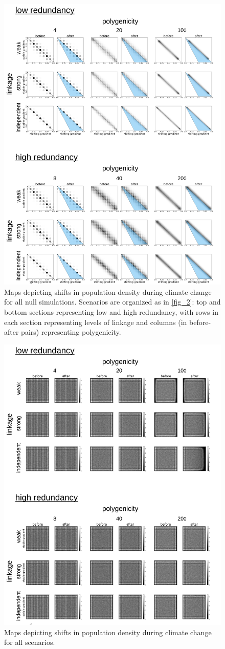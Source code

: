 \documentclass[9pt,twocolumn,twoside,lineno]{pnas-new}
\begin{document}
\begin{figure}
\centering
\includegraphics[width=.8\linewidth]{pub/figs/FIG_S3_phenotypic_shift_null.jpg}
\caption{Maps depicting shifts in population density during climate change for all null simulations. Scenarios are organized as in \ref{fig_2}: top and bottom sections representing low and high redundancy, with rows in each section representing levels of linkage and columns (in before-after pairs) representing polygenicity.}
\label{fig:fig_s3}
\end{figure}


\begin{figure}
\centering
\includegraphics[width=.8\linewidth]{pub/figs/FIG_S4_density_shift.jpg}
\caption{Maps depicting shifts in population density during climate change for all scenarios.}
\label{fig:fig_s4}
\end{figure}

\end{document}
